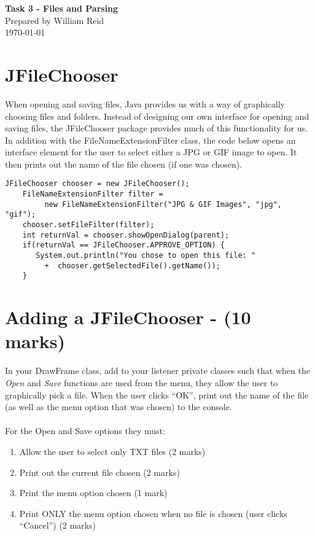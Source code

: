 \documentclass[a4paper,12pt]{article}
\begin{document}
\begin{center}
{\LARGE\bf Task 3 - Files and Parsing}\\
\vspace{0.5cm}
Prepared by William Reid\\
\today
\end{center}

\vspace{0.5cm}
\section{JFileChooser}
When opening and saving files, Java provides us with a way of graphically choosing files and folders. Instead of designing our own interface for opening and saving files, the JFileChooser package provides much of this functionality for us. In addition with the FileNameExtensionFilter class, the code below opens an interface element for the user to select either a JPG or GIF image to open. It then prints out the name of the file chosen (if one was chosen).

\begin{verbatim}
JFileChooser chooser = new JFileChooser();
    FileNameExtensionFilter filter =
    	 new FileNameExtensionFilter("JPG & GIF Images", "jpg", "gif");
    chooser.setFileFilter(filter);
    int returnVal = chooser.showOpenDialog(parent);
    if(returnVal == JFileChooser.APPROVE_OPTION) {
       System.out.println("You chose to open this file: "
       	 +  chooser.getSelectedFile().getName());
    }
\end{verbatim}
  

\section{Adding a JFileChooser - (10 marks)}
In your DrawFrame class, add to your listener private classes such that when the \textit{Open} and \textit{Save} functions are used from the menu, they allow the user to graphically pick a file. When the user clicks ``OK'', print out the name of the file (as well as the menu option that was chosen) to the console.\\
\\
For the Open and Save options they must:
\begin{enumerate}
\item Allow the user to select only TXT files (2 marks)
\item Print out the current file chosen (2 marks)
\item Print the menu option chosen (1 mark)
\item Print ONLY the menu option chosen when no file is chosen (user clicks ``Cancel'') (2 marks)
\end{enumerate}
\end{document}
